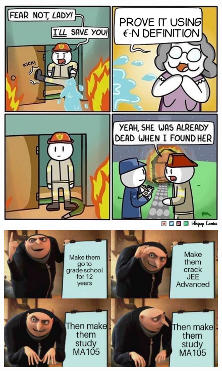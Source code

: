 \documentclass[handout, aspectratio=169]{beamer}
\begin{document}
\begin{frame} 
	\begin{figure}[t]
		\begin{minipage}{0.48\textwidth}
			\centering
			\includegraphics[width=7.5 cm]{34.jpg}
			
		\end{minipage}
		\begin{minipage}{0.48\textwidth}
			\centering
			\includegraphics[width=5 cm]{35.jpg}
			
		\end{minipage}
	\end{figure}
\end{frame}
\end{document}
